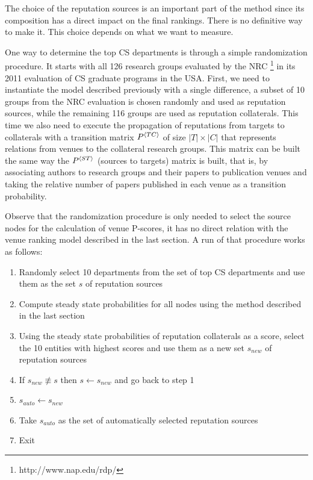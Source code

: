 \documentclass[notitlepage]{svjour3}
\begin{document}
The choice of the reputation sources is an important part of the method since 
its composition has a direct impact on the final rankings. 
There is no definitive way to make it. This choice depends on what we want to measure. 

One way to determine the top CS departments is through a simple randomization procedure.
It starts with all 126 research groups evaluated by the NRC \footnote{http://www.nap.edu/rdp/}
in its 2011 evaluation of CS graduate programs in the USA. 
First, we need to instantiate the model described previously with a single difference, 
a subset of 10 groups from the NRC evaluation is chosen randomly and used as reputation sources, while the remaining 116 groups
are used as reputation collaterals. This time we also need to execute the propagation of reputations 
from targets to collaterals with a transition matrix $P{^{\langle TC \rangle}}$ of size $|T|\times |C|$ that represents
relations from venues to the collateral research groups. This matrix can be built the same way
the $P{^{\langle ST \rangle}}$ (sources to targets) matrix is built, that is, by associating authors to research 
groups and their papers to publication venues and taking the relative number of papers published
in each venue as a transition probability.

Observe that the randomization procedure is only needed to
select the source nodes for the calculation of venue P-scores, it has no direct relation with the venue ranking
model described in the last section. A run of that procedure works as follows: 
\begin{enumerate}
\item Randomly select 10 departments from the set of top CS departments and use them as the set $s$ of reputation sources
\item Compute steady state probabilities for all nodes using the method described in the last section
\item Using the steady state probabilities of reputation collaterals as a score, select the 10 entities with 
highest scores and use them as a new set $s_{new}$ of reputation sources
\item If $s_{new} \not \equiv s$ then $s \leftarrow s_{new}$ and go back to step 1
\item $s_{auto} \leftarrow s_{new}$ 
\item Take $s_{auto}$ as the set of automatically selected reputation sources
\item Exit
\end{enumerate}
\end{document}
